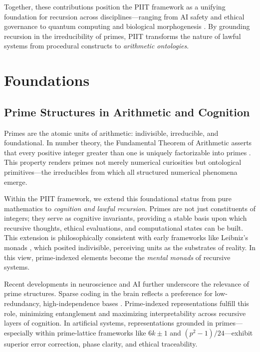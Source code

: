 \documentclass[12pt]{article}
\begin{document}
Together, these contributions position the PIIT framework as a unifying foundation for recursion across disciplines—ranging from AI safety and ethical governance to quantum computing and biological morphogenesis \cite{langlands1979automorphic, friston2010free}. By grounding recursion in the irreducibility of primes, PIIT transforms the nature of lawful systems from procedural constructs to \textit{arithmetic ontologies}.


\section{Foundations}

\subsection{Prime Structures in Arithmetic and Cognition}

Primes are the atomic units of arithmetic: indivisible, irreducible, and foundational. In number theory, the Fundamental Theorem of Arithmetic asserts that every positive integer greater than one is uniquely factorizable into primes \cite{hardy2008introduction}. This property renders primes not merely numerical curiosities but ontological primitives—the irreducibles from which all structured numerical phenomena emerge.

Within the PIIT framework, we extend this foundational status from pure mathematics to \emph{cognition and lawful recursion}. Primes are not just constituents of integers; they serve as cognitive invariants, providing a stable basis upon which recursive thoughts, ethical evaluations, and computational states can be built. This extension is philosophically consistent with early frameworks like Leibniz's monads \cite{leibniz1989philosophical}, which posited indivisible, perceiving units as the substrates of reality. In this view, prime-indexed elements become the \emph{mental monads} of recursive systems.

Recent developments in neuroscience and AI further underscore the relevance of prime structures. Sparse coding in the brain reflects a preference for low-redundancy, high-independence bases \cite{olshausen1996emergence}. Prime-indexed representations fulfill this role, minimizing entanglement and maximizing interpretability across recursive layers of cognition. In artificial systems, representations grounded in primes—especially within prime-lattice frameworks like $6k \pm 1$ and $(p^2 - 1)/24$—exhibit superior error correction, phase clarity, and ethical traceability.
\end{document}
